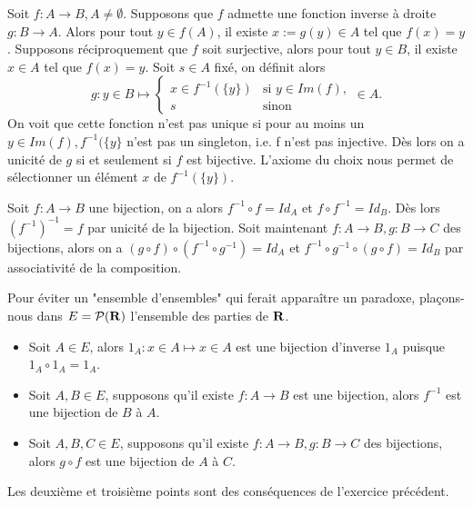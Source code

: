 \begin{exercice}
    Soit $f : A \to B, A \neq \emptyset$.
    Supposons que $f$ admette une fonction inverse à droite $g : B \to A$. Alors pour tout $y \in f(A)$, il existe 
    $x := g(y) \in A$ tel que $f(x) = y$. Supposons réciproquement que $f$ soit surjective, alors pour tout $y \in B$, il
    existe $x \in A$ tel que $f(x) = y$. Soit $s \in A$ fixé, on définit alors 
    \[
        g : y \in B \mapsto 
        \begin{cases}
            x \in f^{-1}(\{y\}) & \text{si } y \in Im(f),\\
            s & \text{sinon}
        \end{cases} \in A.
    \]
    On voit que cette fonction n'est pas unique si pour au moins un $y \in Im(f), f^{-1}(\{y\}$ n'est pas un singleton,
    i.e. f n'est pas injective. Dès lors on a unicité de $g$ si et seulement si $f$ est bijective. L'axiome du choix nous 
    permet de sélectionner un élément $x$ de $f^{-1}(\{y\})$.
    
\end{exercice}

\begin{exercice}
    Soit $f : A \to B$ une bijection, on a alors $f^{-1} \circ f = Id_A$ et $f \circ f^{-1} = Id_B$. Dès lors $(f^{-1})^{-1} = f$ par 
    unicité de la bijection.
    Soit maintenant $f : A \to B, g : B \to C$ des bijections, alors on a $(g \circ f) \circ (f^{-1} \circ g^{-1}) = Id_A$ et 
    $f^{-1} \circ g^{-1} \circ (g \circ f) = Id_B$ par associativité de la composition.
\end{exercice}

\begin{exercice}
    Pour éviter un "ensemble d'ensembles" qui ferait apparaître un paradoxe, plaçons-nous dans $E = \mathcal{P}(\mathbf{R})$ l'ensemble des parties
    de $\mathbf{R}$.
    \begin{itemize}
        \item Soit $A \in E$, alors $1_A : x \in A \mapsto x \in A$ est une bijection d'inverse $1_A$ puisque $1_A \circ 1_A = 1_A$.
        \item Soit $A,B \in E$, supposons qu'il existe $f : A \to B$ est une bijection, alors $f^{-1}$ est une bijection de $B$ à $A$.
        \item Soit $A,B,C \in E$, supposons qu'il existe $f : A \to B, g : B \to C$ des bijections, alors $g \circ f$ est une bijection
        de $A$ à $C$.
    \end{itemize}
    Les deuxième et troisième points sont des conséquences de l'exercice précédent.
\end{exercice}

